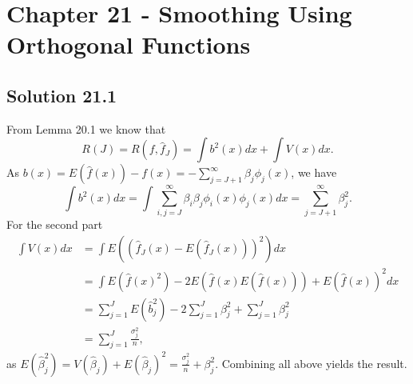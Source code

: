 \section*{Chapter 21 - Smoothing Using Orthogonal Functions}

\subsection*{Solution 21.1}

From Lemma 20.1 we know that
\begin{equation*}
    R(J) = R(f, \hat{f}_J)
        = \int b^2(x) dx + \int V(x) dx.
\end{equation*}
As $b(x) = E(\hat{f}(x)) - f(x) = - \sum_{j = J + 1}^{\infty} \beta_j \phi_j(x)$, we have
\begin{equation*}
    \int b^2(x) dx = \int \sum_{i, j = J}^{\infty} \beta_i \beta_j \phi_i(x) \phi_j(x) dx
        = \sum_{j = J + 1}^{\infty} \beta_j^2.
\end{equation*}
For the second part
\begin{equation*}
    \begin{split}
        \int V(x) dx &= \int E((\hat{f}_J(x) - E(\hat{f}_J(x)))^2) dx \\
            &= \int E(\hat{f}(x)^2) - 2E(\hat{f}(x)E(\hat{f}(x))) + E(\hat{f}(x))^2 dx \\
            &= \sum_{j = 1}^J E(\hat{b}_j^2) - 2\sum_{j = 1}^J \beta_j^2 + \sum_{j = 1}^J \beta_j^2 \\
            &= \sum_{j = 1}^J \frac{\sigma_j^2}{n},
    \end{split}
\end{equation*}
as $E(\hat{\beta}_j^2) = V(\hat{\beta}_j) + E(\hat{\beta}_j)^2 = \frac{\sigma_j^2}{n} + \beta_j^2$.
Combining all above yields the result.
